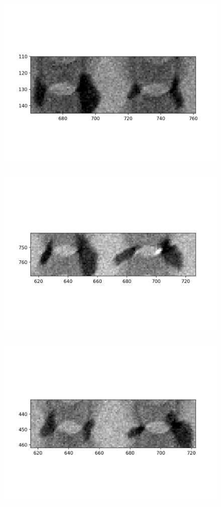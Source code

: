 \documentclass[10pt,a4paper]{article}
\begin{document}
	\begin{figure}[h]
		\includegraphics{data/image_stamps/e6}
	\end{figure}
	\begin{figure}[h]
		\includegraphics{data/image_stamps/e7}
	\end{figure}
	\begin{figure}[h]
		\includegraphics{data/image_stamps/e8}
	\end{figure}
\end{document}
